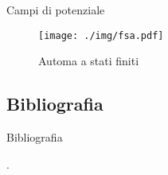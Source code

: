 \documentclass[10pt]{beamer}
\begin{document}
\begin{frame}[allowframebreaks]{Campi di potenziale}
	\begin{figure}[H]
		\centering
		\texttt{[image: ./img/fsa.pdf]}
		\caption{Automa a stati finiti }
		\label{fig:fsa}
	\end{figure}
	\end{frame}

	\subsection{Bibliografia}\label{subsec:Bibliografia}
	\begin{frame}[allowframebreaks]{Bibliografia}
		
		.
	\end{frame}
\end{document}
